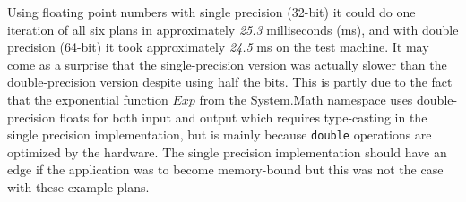 Using floating point numbers with single precision (32-bit) it could do one iteration of all six plans in approximately \emph{25.3} milliseconds (ms), and with double precision (64-bit) it took approximately \emph{24.5} ms on the test machine.
It may come as a surprise that the single-precision version was actually slower than the double-precision version despite using half the bits.
This is partly due to the fact that the exponential function $Exp$ from the System.Math namespace uses double-precision floats for both input and output which requires type-casting in the single precision implementation, but is mainly because \lstinline$double$ operations are optimized by the hardware\cite{northrup2008mcts}.
The single precision implementation should have an edge if the application was to become memory-bound but this was not the case with these example plans.